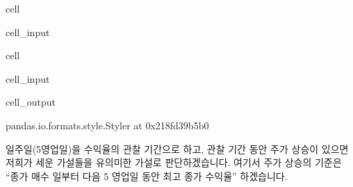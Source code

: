 \documentclass[letterpaper,10pt,english]{jupyterBook}
\begin{document}
\begin{sphinxuseclass}{cell}\begin{sphinxVerbatimInput}

\begin{sphinxuseclass}{cell_input}
\begin{sphinxVerbatim}[commandchars=\\\{\}]
    
  \PYG{p}{[}     \PYG{p}{]}
\end{sphinxVerbatim}

\end{sphinxuseclass}\end{sphinxVerbatimInput}

\end{sphinxuseclass}
\begin{sphinxuseclass}{cell}\begin{sphinxVerbatimInput}

\begin{sphinxuseclass}{cell_input}
\begin{sphinxVerbatim}[commandchars=\\\{\}]
\end{sphinxVerbatim}

\end{sphinxuseclass}\end{sphinxVerbatimInput}
\begin{sphinxVerbatimOutput}

\begin{sphinxuseclass}{cell_output}
\begin{sphinxVerbatim}[commandchars=\\\{\}]
\PYGZlt{}pandas.io.formats.style.Styler at 0x218fd39b5b0\PYGZgt{}
\end{sphinxVerbatim}

\end{sphinxuseclass}\end{sphinxVerbatimOutput}

\end{sphinxuseclass}
\sphinxAtStartPar
일주일(5영업일)을 수익율의 관찰 기간으로 하고, 관찰 기간 동안 주가 상승이 있으면 저희가 세운 가설들을 유의미한 가설로 판단하겠습니다. 여기서 주가 상승의 기준은  “종가 매수 일부터 다음 5 영업일 동안 최고 종가 수익율” 하겠습니다.
\end{document}

